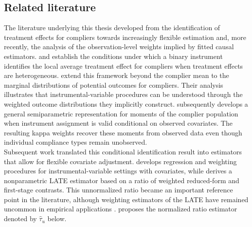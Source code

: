 \documentclass[12pt, a4paper, oneside]{article}
\theoremstyle{plain}
\theoremstyle{definition}
\begin{document}
 
 
 
 
\subsection{Related literature}

The literature underlying this thesis developed from the identification of treatment effects for compliers towards increasingly flexible estimation and, more recently, the analysis of the observation-level weights implied by fitted causal estimators. \citet{angrist1995identification} and \citet{angrist1996identification} establish the conditions under which a binary instrument identifies the local average treatment effect for compliers when treatment effects are heterogeneous. \citet{imbens1997compliers} extend this framework beyond the complier mean to the marginal distributions of potential outcomes for compliers. Their analysis illustrates that instrumental-variable procedures can be understood through the weighted outcome distributions they implicitly construct. \citet{abadie2003semiparametric} subsequently develops a general semiparametric representation for moments of the complier population when instrument assignment is valid conditional on observed covariates. The resulting kappa weights recover these moments from observed data even though individual compliance types remain unobserved.\\
Subsequent work translated this conditional identification result into estimators that allow for flexible covariate adjustment. \citet{tan2006regression} develops regression and weighting procedures for instrumental-variable settings with covariates, while \citet{frolich2007nonparametric} derives a nonparametric LATE estimator based on a ratio of weighted reduced-form and first-stage contrasts. This unnormalized ratio became an important reference point in the literature, although weighting estimators of the LATE have remained uncommon in empirical applications \citep{sloczynski2025abadie}. \citet{uysal2011three} proposes the normalized ratio estimator denoted by $\widehat\tau_u$ below. \\
\end{document}
